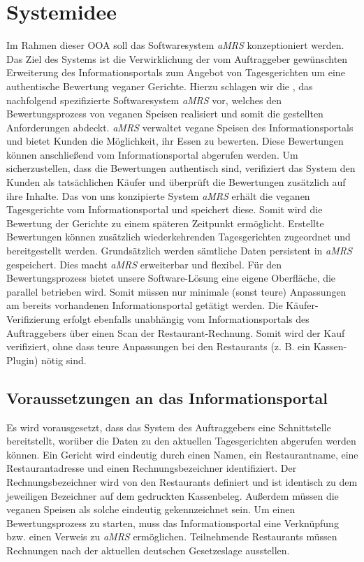 \section{Systemidee}

Im Rahmen dieser \ac{OOA} soll das Softwaresystem \textit{\ac{aMRS}} konzeptioniert werden.
\newparagraph
Das Ziel des Systems ist die Verwirklichung der vom Auftraggeber gewünschten Erweiterung des Informationsportals zum Angebot von Tagesgerichten um eine authentische Bewertung veganer Gerichte. 
Hierzu schlagen wir die \textit{\vFKW}, das nachfolgend spezifizierte Softwaresystem \textit{\ac{aMRS}} vor, welches den Bewertungsprozess von veganen Speisen realisiert und somit die gestellten Anforderungen abdeckt.
\textit{\ac{aMRS}} verwaltet vegane Speisen des Informationsportals und bietet Kunden die Möglichkeit, ihr Essen zu bewerten.
Diese Bewertungen können anschließend vom Informationsportal abgerufen werden.
Um sicherzustellen, dass die Bewertungen authentisch sind, verifiziert das System den Kunden als tatsächlichen Käufer und überprüft die Bewertungen zusätzlich auf ihre Inhalte.
\newparagraph
Das von uns konzipierte System \textit{\ac{aMRS}} erhält die veganen Tagesgerichte vom Informationsportal und speichert diese.
Somit wird die Bewertung der Gerichte zu einem späteren Zeitpunkt ermöglicht.
Erstellte Bewertungen können zusätzlich wiederkehrenden Tagesgerichten zugeordnet und bereitgestellt werden. Grundsätzlich werden sämtliche Daten persistent in \textit{\ac{aMRS}} gespeichert.
Dies macht \textit{\ac{aMRS}} erweiterbar und flexibel.
\newparagraph
Für den Bewertungsprozess bietet unsere Software-Lösung eine eigene Oberfläche, die parallel betrieben wird.
Somit müssen nur minimale (sonst teure) Anpassungen am bereits vorhandenen Informationsportal getätigt werden.
Die Käufer-Verifizierung erfolgt ebenfalls unabhängig vom Informationsportals des Auftraggebers über einen Scan der Restaurant-Rechnung.
Somit wird der Kauf verifiziert, ohne dass teure Anpassungen bei den Restaurants (z. B. ein Kassen-Plugin) nötig sind.

\subsection{Voraussetzungen an das Informationsportal}
Es wird vorausgesetzt, dass das System des Auftraggebers eine Schnittstelle bereitstellt, worüber die Daten zu den aktuellen Tagesgerichten abgerufen werden können.
Ein Gericht wird eindeutig durch einen Namen, ein Restaurantname, eine Restaurantadresse und einen Rechnungsbezeichner identifiziert.
Der Rechnungsbezeichner wird von den Restaurants definiert und ist identisch zu dem jeweiligen Bezeichner auf dem gedruckten Kassenbeleg.
Außerdem müssen die veganen Speisen als solche eindeutig gekennzeichnet sein.
\newparagraph
Um einen Bewertungsprozess zu starten, muss das Informationsportal eine Verknüpfung bzw. einen Verweis zu \textit{\ac{aMRS}} ermöglichen.
Teilnehmende Restaurants müssen Rechnungen nach der aktuellen deutschen Gesetzeslage ausstellen.

